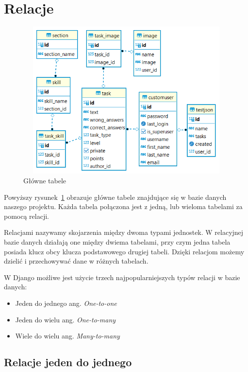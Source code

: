 \documentclass[oneside,polski,logo,indent]{amuthesis}
\begin{document}
\section{Relacje}

\begin{figure}[H]
  \centering
  \includegraphics[width=12cm, height=8cm]{gl-relacje.png}
  \caption{Główne tabele}
  \label{relacje}
\end{figure}

\noindent Powyższy rysunek~\ref{relacje} obrazuje główne tabele znajdujące się w bazie danych naszego projektu. Każda tabela połączona jest z jedną, lub wieloma tabelami za pomocą relacji.

Relacjami nazywamy skojarzenia między dwoma typami jednostek. W relacyjnej bazie danych działają one między dwiema tabelami, przy czym jedna tabela posiada klucz obcy klucza podstawowego drugiej tabeli. Dzięki relacjom możemy dzielić i przechowywać dane w różnych tabelach.

W Django możliwe jest użycie trzech najpopularniejszych typów relacji w bazie danych:

\begin{itemize}
\item Jeden do jednego ang. \emph{One-to-one}
\item Jeden do wielu ang. \emph{One-to-many}
\item Wiele do wielu ang. \emph{Many-to-many}

\end{itemize}


\begin{center}
\subsection{Relacje jeden do jednego}
\end{center}
\end{document}

